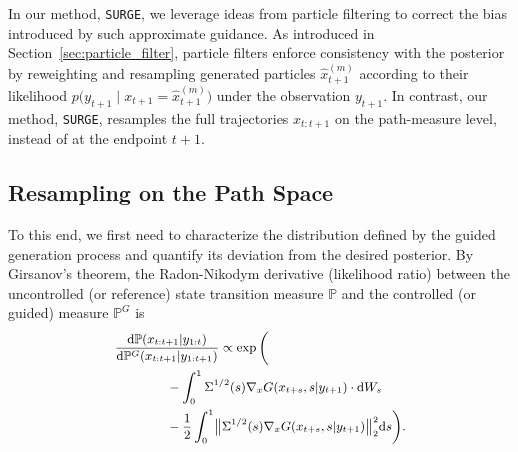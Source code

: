 \documentclass{article}
\newcommand{\dif}{{\mathrm{d}}}
\renewcommand{\P}{{\mathbb{P}}}
\theoremstyle{plain}
\theoremstyle{definition}
\theoremstyle{remark}
\begin{document}
In our method, \texttt{SURGE}, we leverage ideas from particle filtering to correct the bias introduced by such approximate guidance. As introduced in Section~\ref{sec:particle_filter}, particle filters enforce consistency with the posterior by reweighting and resampling generated particles $\hat x_{t+1}^{(m)}$ according to their likelihood $p\bigl(y_{t+1} \mid x_{t+1} = \hat{x}_{t+1}^{(m)}\bigr)$ under the observation $y_{t+1}$. In contrast, our method, \texttt{SURGE}, resamples the full trajectories $x_{t:t+1}$ on the path-measure level, instead of at the endpoint $t+1$.

\subsection{Resampling on the Path Space}

To this end, we first need to characterize the distribution defined by the guided generation process and quantify its deviation from the desired posterior. By Girsanov's theorem, the Radon-Nikodym derivative (likelihood ratio) between the uncontrolled (or reference) state transition measure $\mathbb{P}$ and the controlled (or guided) measure $\mathbb{P}^{G}$ is
\begin{equation*}
\small
\begin{aligned}
    &\frac{\dif \P(x_{t:t+1}|y_{1:t}) }{\dif \P^{G}(x_{t:t+1}|y_{1:t+1})} \propto \exp\bigg(\\
    &\qquad \qquad -\int_0^{1} \Sigma^{1/2}(s) \nabla_x G(x_{t+s}, s|y_{t+1}) \cdot \dif W_s \\
    &\qquad \qquad - \frac{1}{2} \int_0^{1} \bigl\| \Sigma^{1/2}(s) \nabla_x G(x_{t+s}, s|y_{t+1}) \bigr\|_2^2 \dif s \bigg).
\end{aligned}
\end{equation*}
\end{document}
